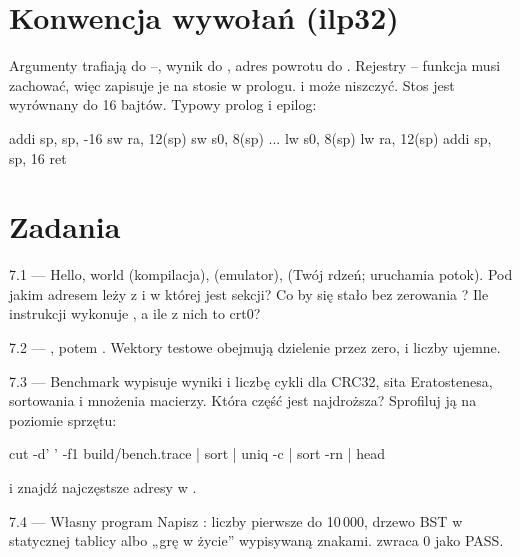 \section{Konwencja wywołań (ilp32)}

Argumenty trafiają do --, wynik do , adres powrotu do
. Rejestry -- funkcja musi zachować, więc zapisuje je
na stosie w prologu.  i  może niszczyć. Stos jest wyrównany do
16 bajtów. Typowy prolog i epilog:
\begin{asm}
    addi sp, sp, -16
    sw   ra, 12(sp)
    sw   s0, 8(sp)
    ...
    lw   s0, 8(sp)
    lw   ra, 12(sp)
    addi sp, sp, 16
    ret
\end{asm}

\section{Zadania}

\begin{zadanie}{7.1 --- Hello, world}
 (kompilacja),  (emulator), 
(Twój rdzeń;  uruchamia potok). Pod jakim adresem leży
 z  i w której jest sekcji? Co by się stało bez
zerowania ? Ile instrukcji wykonuje , a ile z nich to crt0?
\end{zadanie}

\begin{zadanie}{7.2 --- }
, potem . Wektory
testowe obejmują dzielenie przez zero,  i liczby ujemne.
\end{zadanie}

\begin{zadanie}{7.3 --- Benchmark}
 wypisuje wyniki i liczbę cykli dla CRC32, sita
Eratostenesa, sortowania i mnożenia macierzy. Która część jest najdroższa?
Sprofiluj ją na poziomie sprzętu:
\begin{sh}
cut -d' ' -f1 build/bench.trace | sort | uniq -c | sort -rn | head
\end{sh}
i znajdź najczęstsze adresy w .
\end{zadanie}

\begin{zadanie}{7.4 --- Własny program}
Napisz : liczby pierwsze do 10\,000, drzewo BST w statycznej
tablicy albo „grę w życie” wypisywaną znakami.  zwraca 0 jako PASS.
\end{zadanie}

